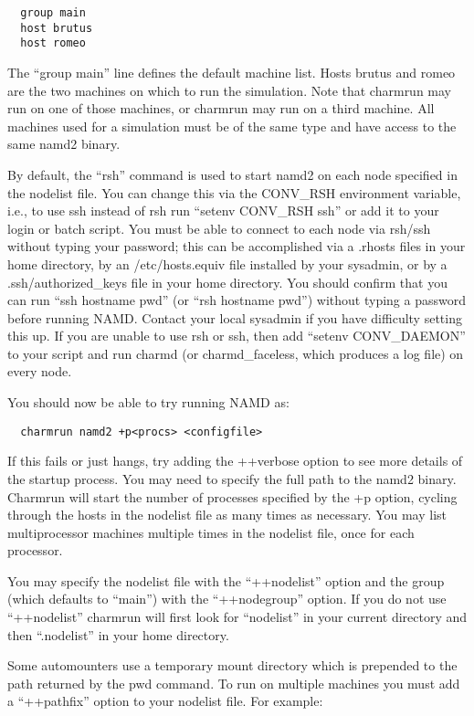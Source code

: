 \begin{verbatim}
  group main
  host brutus
  host romeo
\end{verbatim}

The ``group main'' line defines the default machine list.  Hosts brutus
and romeo are the two machines on which to run the simulation.  Note
that charmrun may run on one of those machines, or charmrun may run
on a third machine.  All machines used for a simulation must be of the
same type and have access to the same namd2 binary.

By default, the ``rsh'' command is used to start namd2
on each node specified in the nodelist file.  You can change this via
the CONV\_RSH environment variable, i.e., to use ssh instead of rsh run
``setenv CONV\_RSH ssh'' or add it to your login or batch script.  You
must be able to connect to each node via rsh/ssh without typing your
password; this can be accomplished via a .rhosts files in your home
directory, by an /etc/hosts.equiv file installed by your sysadmin, or
by a .ssh/authorized\_keys file in your home directory.  You should
confirm that you can run ``ssh hostname pwd'' (or ``rsh hostname pwd'')
without typing a password before running NAMD.  Contact your local
sysadmin if you have difficulty setting this up.  If you are unable to
use rsh or ssh, then add ``setenv CONV\_DAEMON'' to your script and run 
charmd (or charmd\_faceless, which produces a log file) on every node.

You should now be able to try running NAMD as:

\begin{verbatim}
  charmrun namd2 +p<procs> <configfile>
\end{verbatim}

If this fails or just hangs, try adding the ++verbose option to see
more details of the startup process.  You may need to specify the full
path to the namd2 binary.  Charmrun will start the number of processes
specified by the +p option, cycling through the hosts in the nodelist
file as many times as necessary.  You may list multiprocessor machines
multiple times in the nodelist file, once for each processor.

You may specify the nodelist file with the ``++nodelist'' option and the
group (which defaults to ``main'') with the ``++nodegroup'' option.  If
you do not use ``++nodelist'' charmrun will first look for ``nodelist''
in your current directory and then ``.nodelist'' in your home directory.

Some automounters use a temporary mount directory which is prepended
to the path returned by the pwd command.  To run on multiple machines
you must add a ``++pathfix'' option to your nodelist file.  For example:

